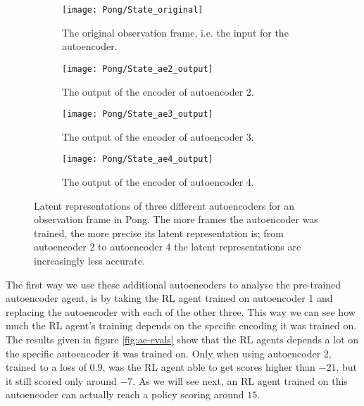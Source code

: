 \begin{figure}[h]
	\centering
	\begin{subfigure}[b]{0.40\textwidth}
		\texttt{[image: Pong/State\_original]}
		\caption{The original observation frame, i.e. the input for the autoencoder.}
		\label{fig:ae-state-original-pong} 
	\end{subfigure}\hfill
	\begin{subfigure}[b]{0.40\textwidth}
		\texttt{[image: Pong/State\_ae2\_output]}
		\caption{The output of the encoder of autoencoder 2.}
		\medskip
		\label{fig:ae1-state-pong}
	\end{subfigure}
	\begin{subfigure}[b]{0.4\textwidth}
		\texttt{[image: Pong/State\_ae3\_output]}
		\caption{The output of the encoder of autoencoder 3.}
		\label{fig:ae2-state-pong}
	\end{subfigure}\hfill
	\begin{subfigure}[b]{0.4\textwidth}
		\texttt{[image: Pong/State\_ae4\_output]}
		\caption{The output of the encoder of autoencoder 4.}
		\label{fig:ae3-state-pong}
	\end{subfigure}
	\caption{Latent representations of three different autoencoders for an observation frame in Pong. The more frames the autoencoder was trained, the more precise its latent representation is; from autoencoder 2 to autoencoder 4 the latent representations are increasingly less accurate.}
	\label{fig:ae-output-pong}
\end{figure}

The first way we use these additional autoencoders to analyse the pre-trained autoencoder agent, is by taking the RL agent trained on autoencoder 1 and replacing the autoencoder with each of the other three. This way we can see how much the RL agent's training depends on the specific encoding it was trained on. The results given in figure \ref{fig:ae-evals} show that the RL agents depends a lot on the specific autoencoder it was trained on. Only  when using autoencoder 2, trained to a loss of 0.9, was the RL agent able to get scores higher than $-21$, but it still scored only around $-7$. As we will see next, an RL agent trained on this autoencoder can actually reach a policy scoring around $15$.

